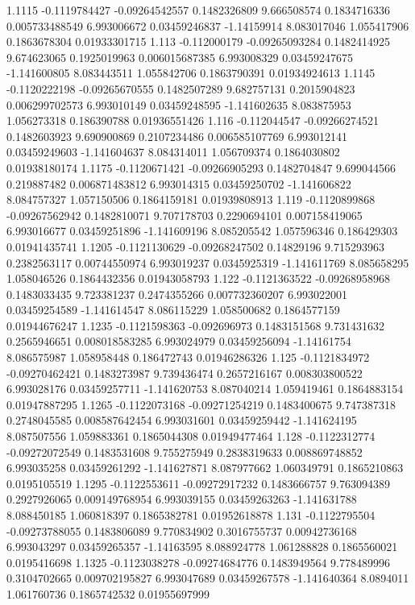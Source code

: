 {1.1115 -0.1119784427 -0.09264542557 0.1482326809 9.666508574 0.1834716336 0.005733488549 6.993006672 0.03459246837 -1.14159914 8.083017046 1.055417906 0.1863678304 0.01933301715
1.113 -0.112000179 -0.09265093284 0.1482414925 9.674623065 0.1925019963 0.006015687385 6.993008329 0.03459247675 -1.141600805 8.083443511 1.055842706 0.1863790391 0.01934924613
1.1145 -0.1120222198 -0.09265670555 0.1482507289 9.682757131 0.2015904823 0.006299702573 6.993010149 0.03459248595 -1.141602635 8.083875953 1.056273318 0.186390788 0.01936551426
1.116 -0.112044547 -0.09266274521 0.1482603923 9.690900869 0.2107234486 0.006585107769 6.993012141 0.03459249603 -1.141604637 8.084314011 1.056709374 0.1864030802 0.01938180174
1.1175 -0.1120671421 -0.09266905293 0.1482704847 9.699044566 0.219887482 0.006871483812 6.993014315 0.03459250702 -1.141606822 8.084757327 1.057150506 0.1864159181 0.01939808913
1.119 -0.1120899868 -0.09267562942 0.1482810071 9.707178703 0.2290694101 0.007158419065 6.993016677 0.03459251896 -1.141609196 8.085205542 1.057596346 0.186429303 0.01941435741
1.1205 -0.1121130629 -0.09268247502 0.14829196 9.715293963 0.2382563117 0.00744550974 6.993019237 0.0345925319 -1.141611769 8.085658295 1.058046526 0.1864432356 0.01943058793
1.122 -0.1121363522 -0.09268958968 0.1483033435 9.723381237 0.2474355266 0.007732360207 6.993022001 0.03459254589 -1.141614547 8.086115229 1.058500682 0.1864577159 0.01944676247
1.1235 -0.1121598363 -0.092696973 0.1483151568 9.731431632 0.2565946651 0.008018583285 6.993024979 0.03459256094 -1.14161754 8.086575987 1.058958448 0.186472743 0.01946286326
1.125 -0.1121834972 -0.09270462421 0.1483273987 9.739436474 0.2657216167 0.008303800522 6.993028176 0.03459257711 -1.141620753 8.087040214 1.059419461 0.1864883154 0.01947887295
1.1265 -0.1122073168 -0.09271254219 0.1483400675 9.747387318 0.2748045585 0.008587642454 6.993031601 0.03459259442 -1.141624195 8.087507556 1.059883361 0.1865044308 0.01949477464
1.128 -0.1122312774 -0.09272072549 0.1483531608 9.755275949 0.2838319633 0.008869748852 6.993035258 0.03459261292 -1.141627871 8.087977662 1.060349791 0.1865210863 0.0195105519
1.1295 -0.1122553611 -0.09272917232 0.1483666757 9.763094389 0.2927926065 0.009149768954 6.993039155 0.03459263263 -1.141631788 8.088450185 1.060818397 0.1865382781 0.01952618878
1.131 -0.1122795504 -0.09273788055 0.1483806089 9.770834902 0.3016755737 0.00942736168 6.993043297 0.03459265357 -1.14163595 8.088924778 1.061288828 0.1865560021 0.0195416698
1.1325 -0.1123038278 -0.09274684776 0.1483949564 9.778489996 0.3104702665 0.009702195827 6.993047689 0.03459267578 -1.141640364 8.0894011 1.061760736 0.1865742532 0.01955697999
}
